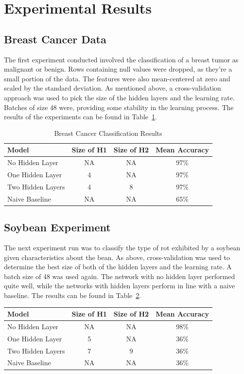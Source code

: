 \documentclass{amsart}
\begin{document}
    \section{Experimental Results}
    \subsection*{Breast Cancer Data}
    The first experiment conducted involved the classification of a breast tumor
    as malignant or benign\cite{cancerdataset}. Rows containing null values were dropped, as they're a small portion of the
    data. The features were also mean-centered at zero and scaled by the standard deviation.
    As mentioned above, a cross-validation approach was used to pick the size of the hidden layers and
    the learning rate. Batches of size 48 were, providing some stability in the learning process.
    The results of the experiments can be found in Table~\ref{breast_results}.
    \begin{table}[H]
    \begin{tabular}{lccc}
    Model & Size of H1 & Size of H2 & Mean Accuracy \\
    \hline
    No Hidden Layer & NA & NA & 97\%\\
    One Hidden Layer & 4 & NA & 97\% \\
    Two Hidden Layers & 4 & 8 & 97\% \\
    Naive Baseline & NA & NA & 65\%
    \end{tabular}
    \label{breast_results}
    \caption{Breast Cancer Classification Results}
    \end{table}


    \subsection*{Soybean Experiment}
    The next experiment run was to classify the type of rot exhibited by a soybean given
    characteristics about the bean\cite{soybeandataset}. As above, cross-validation was used to determine the best
    size of both of the hidden layers and the learning rate. A batch size of 48 was used again.
    The network with no hidden layer performed quite well, while the networks with hidden layers
    perform in line with a naive baseline. The results can be found in Table~\ref{soybean_results}.
    \begin{table}[H]
    \begin{tabular}{lccc}
    Model & Size of H1 & Size of H2 & Mean Accuracy \\
    \hline
    No Hidden Layer & NA & NA & 98\%  \\
    One Hidden Layer & 5 & NA & 36\% \\
    Two Hidden Layers & 7 & 9 & 36\% \\
    Naive Baseline & NA & NA & 36\%
    \end{tabular}
    \label{soybean_results}
    \end{table}
\end{document}
